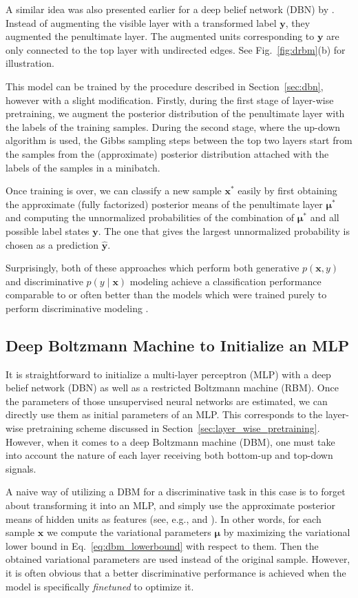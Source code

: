 \documentclass[dissertation,nocontribution,draft*]{aaltoseries}
\newcommand{\vect}[1]{\mathbf{#1}}
\newcommand{\vects}[1]{\boldsymbol{#1}}
\newcommand{\vx}[0]{\vect{x}}
\newcommand{\vy}[0]{\vect{y}}
\newcommand{\vmu}[0]{\vects{\mu}}
\begin{document}
A similar idea was also presented earlier for a deep belief
network (DBN) by \citet{Hinton2006nc}. Instead of augmenting
the visible layer with a transformed label $\vy$, they
augmented the penultimate layer. The augmented units
corresponding to $\vy$ are only connected to the top layer
with undirected edges. See Fig.~\ref{fig:drbm}(b) for
illustration.

This model can be trained by the procedure described in
Section~\ref{sec:dbn}, however with a slight modification.
Firstly, during the first stage of layer-wise pretraining,
we augment the posterior distribution of the penultimate
layer with the labels of the training samples. During the
second stage, where the up-down algorithm is used, the Gibbs
sampling steps between the top two layers start from the
samples from the (approximate) posterior distribution
attached with the labels of the samples in a minibatch. 

Once training is over, we can classify a new sample $\vx^*$
easily by first obtaining the approximate (fully factorized)
posterior means of the penultimate layer $\vmu^*$ and
computing the unnormalized probabilities of the combination
of $\vmu^*$ and all possible label states $\vy$. The one
that gives the largest unnormalized probability is
chosen as a prediction $\hat{\vy}$.

Surprisingly, both of these approaches which perform both
generative $p(\vx, y)$ and discriminative $p(y \mid \vx)$
modeling achieve a classification performance comparable
to or often better than the models which were trained
purely to perform discriminative modeling
\citep{Hinton2006nc,Larochelle2008}.

\subsection{Deep Boltzmann Machine to Initialize an MLP}
\label{sec:mlp_dbm}

It is straightforward to initialize a multi-layer perceptron
(MLP) with a deep belief network (DBN) as well as a
restricted Boltzmann machine (RBM). Once the parameters of
those unsupervised neural networks are estimated, we can
directly use them as initial parameters of an MLP. This
corresponds to the layer-wise pretraining scheme discussed
in Section~\ref{sec:layer_wise_pretraining}.  However, when
it comes to a deep Boltzmann machine (DBM), one must take
into account the nature of each layer receiving both
bottom-up and top-down signals.

A naive way of utilizing a DBM for a discriminative task in
this case is to forget about transforming it into an MLP,
and simply use the approximate posterior means of hidden
units as features (see, e.g., \citet{Montavon2012ai} and
). In other words, for
each sample $\vx$ we compute the variational parameters
$\vmu$ by maximizing the variational lower bound in
Eq.~\eqref{eq:dbm_lowerbound} with respect to them. Then
the obtained variational parameters are used instead of the
original sample.  However, it is often obvious that a
better discriminative performance is achieved when the model
is specifically \textit{finetuned} to optimize it.
\end{document}
